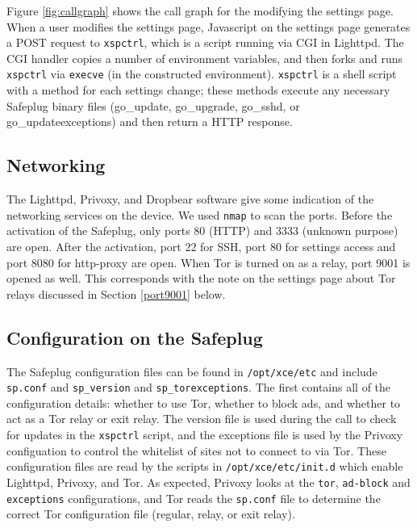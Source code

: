 \documentclass[letterpaper,twocolumn,10pt]{article}
\begin{document}
Figure \ref{fig:callgraph} shows the call graph for the modifying the settings page.  When a user modifies the settings page, Javascript on the settings page generates a POST request to {\tt xspctrl}, which is a script running via CGI in Lighttpd. The CGI handler copies a number of environment variables, and then forks and runs {\tt xspctrl} via {\tt execve} (in the constructed environment). {\tt xspctrl} is a shell script with a method for each settings change; these methods execute any necessary Safeplug binary files (go\_update, go\_upgrade, go\_sshd, or go\_updateexceptions) and then return a HTTP response.


\subsection{Networking}
The Lighttpd, Privoxy, and Dropbear software give some indication of the networking services on the device.  We used \texttt{nmap} to scan the ports.  Before the activation of the Safeplug, only ports 80 (HTTP) and 3333 (unknown purpose) are open.  After the activation, port 22 for SSH, port 80 for settings access and port 8080 for http-proxy are open.  When Tor is turned on as a relay, port 9001 is opened as well.  This corresponds with the note on the settings page about Tor relays discussed in Section \ref{port9001} below.
    
\subsection{Configuration on the Safeplug}
\label{spconfig}
The Safeplug configuration files can be found in \verb!/opt/xce/etc! and include \verb!sp.conf! and \verb!sp_version! and \verb!sp_torexceptions!.  The first contains all of the configuration details: whether to use Tor, whether to block ads, and whether to act as a Tor relay or exit relay. The version file is used during the call to check for updates in the \verb!xspctrl! script, and the exceptions file is used by the Privoxy configuation to control the whitelist of sites not to connect to via Tor.  These configuration files are read by the scripts in \verb!/opt/xce/etc/init.d! which enable Lighttpd, Privoxy, and Tor.  As expected, Privoxy looks at the \verb!tor!, \verb!ad-block! and \verb!exceptions! configurations, and Tor reads the \verb!sp.conf! file to determine the correct Tor configuration file (regular, relay, or exit relay).
\end{document}
